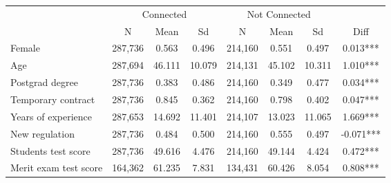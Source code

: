 \begin{tabular}{lccccccc}
\hline  & \multicolumn{3}{c}{Connected} & \multicolumn{3}{c}{Not Connected} & \\
 & N & Mean & Sd & N & Mean & Sd & Diff\\
\hline Female & 287,736 & 0.563 & 0.496 & 214,160 & 0.551 & 0.497 & 0.013***\\
Age & 287,694 & 46.111 & 10.079 & 214,131 & 45.102 & 10.311 & 1.010***\\
Postgrad degree & 287,736 & 0.383 & 0.486 & 214,160 & 0.349 & 0.477 & 0.034***\\
Temporary contract & 287,736 & 0.845 & 0.362 & 214,160 & 0.798 & 0.402 & 0.047***\\
Years of experience & 287,653 & 14.692 & 11.401 & 214,107 & 13.023 & 11.065 & 1.669***\\
New regulation & 287,736 & 0.484 & 0.500 & 214,160 & 0.555 & 0.497 & -0.071***\\
Students test score & 287,736 & 49.616 & 4.476 & 214,160 & 49.144 & 4.424 & 0.472***\\
Merit exam test score & 164,362 & 61.235 & 7.831 & 134,431 & 60.426 & 8.054 & 0.808***\\
\hline\end{tabular}\\
\hfil\\
